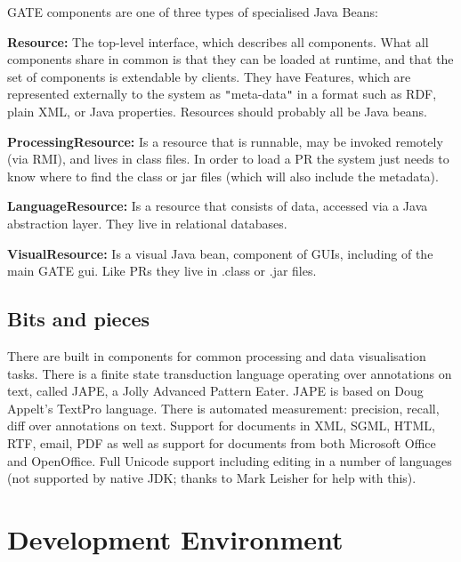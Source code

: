 GATE components are one of three types of specialised Java Beans:

{\bf Resource:}\newline
The top-level interface, which describes all components. What all 
components share in common is that they can be loaded at runtime,
and that the set of components is extendable by clients. They
have Features, which are represented externally to the system as
{\tt{}"{}}meta-data{\tt{}"{}} in a format such as RDF, plain XML, or Java properties.
Resources should probably all be Java beans.

{\bf ProcessingResource:}\newline
Is a resource that is runnable, may be invoked remotely (via RMI),
and lives in class files. In order to load a PR the system just
needs to know where to find the class or jar files (which will 
also include the metadata).

{\bf LanguageResource:}\newline
Is a resource that consists of data, accessed via a Java abstraction
layer. They live in relational databases.

{\bf VisualResource:}\newline
Is a visual Java bean, component of GUIs, including of the main GATE 
gui.  Like PRs they live in .class or .jar files.

\subsection{Bits and pieces}

There are built in components for common processing and data visualisation
tasks.
There is a finite state transduction language operating over
annotations on text, called JAPE, a Jolly Advanced Pattern Eater. JAPE 
is based on Doug Appelt's TextPro language.
There is automated measurement: precision, recall, diff over annotations
on text.
Support for documents in XML, SGML, HTML, RTF, email, PDF as well as
support for documents from both Microsoft Office and OpenOffice.
Full Unicode support including editing in a number of languages (not
supported by native JDK; thanks to Mark Leisher for help with this).

\section{Development Environment}

